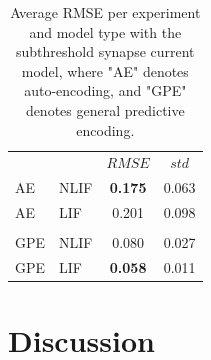 \documentclass[mphil,deptreport,ianc]{infthesis} %
\begin{document}
\begin{table}
\caption{Average RMSE per experiment and model type with the subthreshold synapse current model, where "AE" denotes auto-encoding, and "GPE" denotes general predictive encoding.}
\label{tab:RMSE_per_exp_gating}
\begin{center}
\begin{tabular}{ l l c c }
 & & $RMSE$ & $std$ \\
AE & NLIF & \textbf{0.175} & 0.063 \\ 
AE & LIF & 0.201 & 0.098 \\  
 \\
GPE & NLIF & 0.080 & 0.027 \\ 
GPE & LIF & \textbf{0.058} & 0.011 \\  
\end{tabular}
\end{center}
\end{table}



\section{Discussion}
\end{document}
